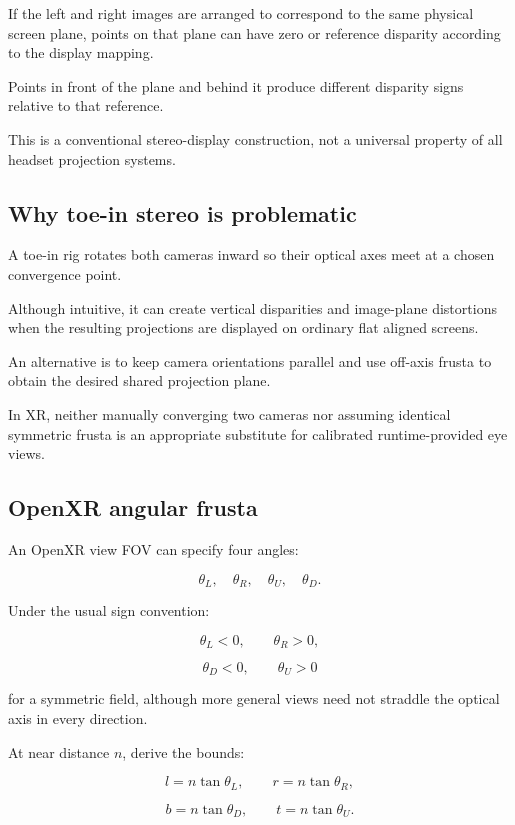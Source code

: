 If the left and right images are arranged to correspond to the same physical screen plane, points on that plane can have zero or reference disparity according to the display mapping.

Points in front of the plane and behind it produce different disparity signs relative to that reference.

This is a conventional stereo-display construction, not a universal property of all headset projection systems.

\subsection{Why toe-in stereo is problematic}\label{02-foundations-ii-ch035-why-toe-in-stereo-is-problematic}

A toe-in rig rotates both cameras inward so their optical axes meet at a chosen convergence point.

Although intuitive, it can create vertical disparities and image-plane distortions when the resulting projections are displayed on ordinary flat aligned screens.

An alternative is to keep camera orientations parallel and use off-axis frusta to obtain the desired shared projection plane.

In XR, neither manually converging two cameras nor assuming identical symmetric frusta is an appropriate substitute for calibrated runtime-provided eye views.

\subsection{OpenXR angular frusta}\label{02-foundations-ii-ch035-openxr-angular-frusta}

An OpenXR view FOV can specify four angles:

\[ \theta_L,\quad\theta_R,\quad\theta_U,\quad\theta_D. \]

Under the usual sign convention:

\[ \theta_L<0,\qquad\theta_R>0, \]

\[ \theta_D<0,\qquad\theta_U>0 \]

for a symmetric field, although more general views need not straddle the optical axis in every direction.

At near distance \(n\), derive the bounds:

\[ \boxed{ l=n\tan\theta_L,\qquad r=n\tan\theta_R, } \]

\[ \boxed{ b=n\tan\theta_D,\qquad t=n\tan\theta_U. } \]

